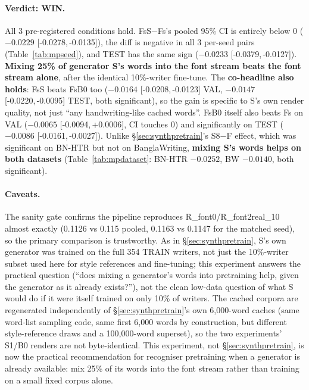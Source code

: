 \documentclass[10.5pt,a4paper]{article}
\newcommand{\ci}[2]{{\footnotesize[#1,\,#2]}}
\begin{document}
\paragraph{Verdict: WIN.} All 3 pre-registered conditions hold. FsS$-$Fs's pooled 95\% CI is entirely below 0 ($-0.0229$
\ci{-0.0278}{-0.0135}), the diff is negative in all 3 per-seed pairs (Table~\ref{tab:mpseed}), and TEST has the same sign
($-0.0233$ \ci{-0.0379}{-0.0127}). \textbf{Mixing 25\% of generator S's words into the font stream beats the font stream
alone}, after the identical 10\%-writer fine-tune. The \textbf{co-headline also holds}: FsS beats FsB0 too
($-0.0164$ \ci{-0.0208}{-0.0123} VAL, $-0.0147$ \ci{-0.0220}{-0.0095} TEST, both significant), so the gain is specific to
S's own render quality, not just ``any handwriting-like cached words''. FsB0 itself also beats Fs on VAL
($-0.0065$ \ci{-0.0094}{+0.0006}, CI touches 0) and significantly on TEST ($-0.0086$ \ci{-0.0161}{-0.0027}). Unlike
\S\ref{sec:synthpretrain}'s S8$-$F effect, which was significant on BN-HTR but not on BanglaWriting, \textbf{mixing S's
words helps on both datasets} (Table~\ref{tab:mpdataset}: BN-HTR $-0.0252$, BW $-0.0140$, both significant).

\paragraph{Caveats.} The sanity gate confirms the pipeline reproduces R\_font0/R\_font2real\_10 almost exactly (0.1126 vs
0.115 pooled, 0.1163 vs 0.1147 for the matched seed), so the primary comparison is trustworthy. As in
\S\ref{sec:synthpretrain}, S's own generator was trained on the full 354 TRAIN writers, not just the 10\%-writer subset
used here for style references and fine-tuning; this experiment answers the practical question (``does mixing a
generator's words into pretraining help, given the generator as it already exists?''), not the clean low-data question
of what S would do if it were itself trained on only 10\% of writers. The cached corpora are regenerated independently of
\S\ref{sec:synthpretrain}'s own 6,000-word caches (same word-list sampling code, same first 6,000 words by construction,
but different style-reference draws and a 100,000-word superset), so the two experiments' S1/B0 renders are not
byte-identical. This experiment, not \S\ref{sec:synthpretrain}, is now the practical recommendation for recogniser
pretraining when a generator is already available: mix 25\% of its words into the font stream rather than training on a
small fixed corpus alone.
\end{document}

